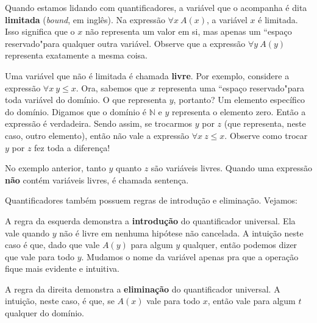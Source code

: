         Quando estamos lidando com quantificadores, a variável que o acompanha é dita \textbf{limitada} (\textit{bound}, em inglês).
        Na expressão $\forall x \ A(x)$, a variável $x$ é limitada.
        Isso significa que o $x$ não representa um valor em si, mas apenas um ``espaço reservado"\space para qualquer outra variável.
        Observe que a expressão $\forall y \ A(y)$ representa exatamente a mesma coisa.

        Uma variável que não é limitada é chamada \textbf{livre}. Por exemplo, considere a expressão $\forall x \ y \le x$.
        Ora, sabemos que $x$ representa uma ``espaço reservado"\space para toda variável do domínio. O que representa $y$, portanto?
        Um elemento específico do domínio. Digamos que o domínio é $\mathbb{N}$ e $y$ representa o elemento zero. Então a expressão é verdadeira.
        Sendo assim, se trocarmos $y$ por $z$ (que representa, neste caso, outro elemento), então não vale a expressão $\forall x \ z \le x$.
        Observe como trocar $y$ por $z$ fez toda a diferença!

        No exemplo anterior, tanto $y$ quanto $z$ são variáveis livres. Quando uma expressão \textbf{não} contém variáveis livres, é chamada sentença.

        Quantificadores também possuem regras de introdução e eliminação. Vejamos:
        
        \begin{center}
            \begin{bprooftree}
            \end{bprooftree}
            \begin{bprooftree}
            \end{bprooftree}
        \end{center}

        A regra da esquerda demonstra a \textbf{introdução} do quantificador universal. Ela vale quando $y$ não é livre em nenhuma hipótese não cancelada.
        A intuição neste caso é que, dado que vale $A(y)$ para algum $y$ qualquer, então podemos dizer que vale para todo $y$. Mudamos o nome da variável apenas
        pra que a operação fique mais evidente e intuitiva.

        A regra da direita demonstra a \textbf{eliminação} do quantificador universal. A intuição, neste caso,
        é que, se $A(x)$ vale para todo $x$, então vale para algum $t$ qualquer do domínio.

